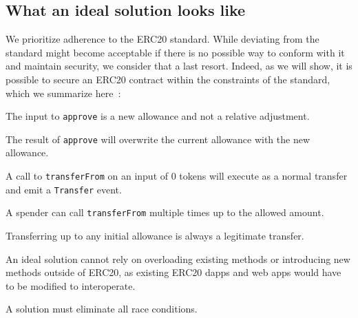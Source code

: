 \subsection{What an ideal solution looks like}
\label{sec:criteria}

We prioritize adherence to the ERC20 standard. While deviating from the standard might become acceptable if there is no possible way to conform with it and maintain security, we consider that a last resort. Indeed, as we will show, it is possible to secure an ERC20 contract within the constraints of the standard, which we summarize here~\cite{Ref08}:

\begin{compactlistn}
\item The input to \texttt{approve} is a new allowance and not a relative adjustment.
\item The result of \texttt{approve} will overwrite the current allowance with the new allowance.
\item A call to \texttt{transferFrom} on an input of 0 tokens will execute as a normal transfer and emit a \texttt{Transfer} event.
\item A spender can call \texttt{transferFrom} multiple times up to the allowed amount.
\item Transferring up to any initial allowance is always a legitimate transfer.
\item An ideal solution cannot rely on overloading existing methods or introducing new methods outside of ERC20, as existing ERC20 dapps and web apps would have to be modified to interoperate.
\item A solution must eliminate all race conditions.
\end{compactlistn}
